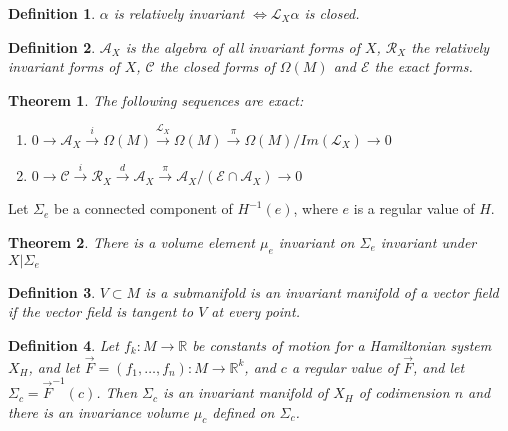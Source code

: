 \documentclass{article}
\newtheorem{thm}{Theorem}
\newtheorem{defn}{Definition}
\begin{document}
\begin{defn}

$\alpha$ is relatively invariant $\iff \mathcal{L}_X \alpha$ is closed.

\end{defn}

\begin{defn}

$\mathcal{A}_X$ is the algebra of all invariant forms of $X$, $\mathcal{R}_X$ the relatively invariant forms of $X$, $\mathcal{C}$ the closed forms of $\Omega (M)$ and $\mathcal{E}$ the exact forms.

\end{defn}

\begin{thm}

The following sequences are exact:
\begin{enumerate}
    \item $0 \to \mathcal{A}_X \overset{i}{\to} \Omega(M) \overset{\mathcal{L}_X}{\to} \Omega (M) \overset{\pi}{\to} \Omega (M)/ Im(\mathcal{L}_X) \to 0$
    \item $0 \to \mathcal{C} \overset{i}{\to} \mathcal{R}_X \overset{d}{\to} \mathcal{A}_X \overset{\pi}{\to} \mathcal{A}_X / (\mathcal{E} \cap \mathcal{A}_X ) \to 0$
\end{enumerate}
\end{thm}

Let $\Sigma_e$ be a connected component of $H^{-1}(e)$, where $e$ is a regular value of $H$. 

\begin{thm}
There is a volume element $\mu_e$ invariant on $\Sigma_e$ invariant under $X\vert \Sigma_e$
\end{thm}
\begin{defn}

$V \subset M$ is a submanifold is an invariant manifold of a vector field if the vector field is tangent to $V$ at every point.

\end{defn}

\begin{defn}

Let $f_k:M \to \mathbb{R}$ be constants of motion for a Hamiltonian system $X_H$, and let $\Vec{F} = (f_1, \ldots, f_n): M \to \mathbb{R}^k$, and $c$ a regular value of $\Vec{F}$, and let $\Sigma_c = \Vec{F}^{-1}(c)$. Then $\Sigma_c$ is an invariant manifold of $X_H$ of codimension $n$ and there is an invariance volume $\mu_c$ defined on $\Sigma_c$. 

\end{defn}
\end{document}
